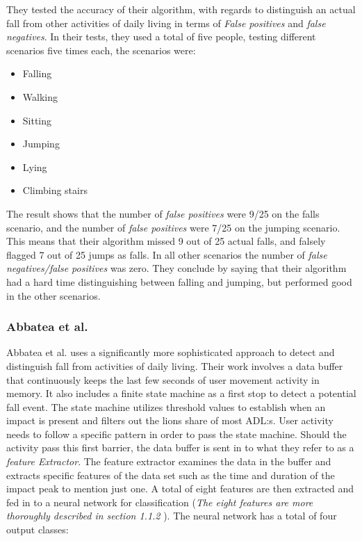 \documentclass[12pt, a4paper, onecolumn]{article}
\begin{document}
	They tested the accuracy of their algorithm, with regards to distinguish an actual fall from other activities of daily living in terms of \textit{False positives} and \textit{false negatives}. In their tests, they used a total of five people, testing different scenarios five times each, the scenarios were:
	
	\begin{itemize}
		\item Falling
		\item Walking
		\item Sitting
		\item Jumping
		\item Lying
		\item Climbing stairs
	\end{itemize}
	
	The result shows that the number of \textit{false positives} were 9/25 on the falls scenario, and the number of \textit{false positives} were 7/25 on the jumping scenario. This means that their algorithm missed 9 out of 25 actual falls, and falsely flagged 7 out of 25 jumps as falls. In all other scenarios the number of \textit{false negatives/false positives} was zero. They conclude by saying that their algorithm had a hard time distinguishing between falling and jumping, but performed good in the other scenarios. 
	
	
	\subsubsection{Abbatea et al.}
	Abbatea et al. uses a significantly more sophisticated approach to detect and distinguish fall from activities of daily living. Their work involves a data buffer that continuously keeps the last few seconds of user movement activity in memory. It also includes a finite state machine as a first stop to detect a potential fall event. The state machine utilizes threshold values to establish when an impact is present and filters out the lions share of most ADL:s. User activity needs to follow a specific pattern in order to pass the state machine. Should the activity pass this first barrier, the data buffer is sent in to what they refer to as a \textit{feature Extractor}. The feature extractor examines the data in the buffer and extracts specific features of the data set such as the time and duration of the impact peak to mention just one. A total of eight features are then extracted and fed in to a neural network for classification  (\textit{The eight features are more thoroughly described in section 1.1.2 }). The neural network has a total of four output classes:
\end{document}
